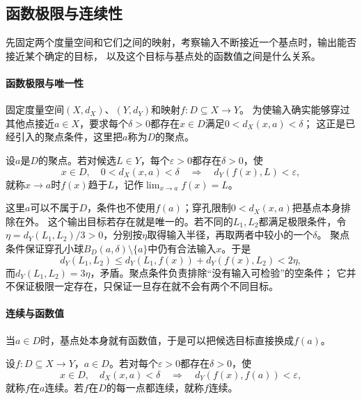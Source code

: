 \subsection{函数极限与连续性}
\label{sec:metric-map-limits}

先固定两个度量空间和它们之间的映射，考察输入不断接近一个基点时，输出能否接近某个确定的目标，
以及这个目标与基点处的函数值之间是什么关系。

\paragraph{函数极限与唯一性}

固定度量空间$(X,d_X)$、$(Y,d_Y)$和映射$f:D\subseteq X\to Y$。
为使输入确实能够穿过其他点接近$a\in X$，要求每个$\delta>0$都存在$x\in D$满足$0<d_X(x,a)<\delta$；
这正是已经引入的聚点条件，这里把$a$称为$D$的聚点。

\begin{definition}[函数极限]
\label{def:metric-function-limit}
设$a$是$D$的聚点。若对候选$L\in Y$，每个$\varepsilon>0$都存在$\delta>0$，使
\[
  x\in D,\quad 0<d_X(x,a)<\delta
  \quad\Longrightarrow\quad d_Y(f(x),L)<\varepsilon,
\]
就称$x\to a$时$f(x)$趋于$L$，记作$\lim_{x\to a}f(x)=L$。
\end{definition}

这里$a$可以不属于$D$，条件也不使用$f(a)$；穿孔限制$0<d_X(x,a)$把基点本身排除在外。
这个输出目标若存在就是唯一的。若不同的$L_1,L_2$都满足极限条件，令
$\eta=d_Y(L_1,L_2)/3>0$，分别按$\eta$取得输入半径，再取两者中较小的一个$\delta$。
聚点条件保证穿孔小球$B_D(a,\delta)\setminus\{a\}$中仍有合法输入$x$。于是
\[
  d_Y(L_1,L_2)
  \leq d_Y(L_1,f(x))+d_Y(f(x),L_2)<2\eta,
\]
而$d_Y(L_1,L_2)=3\eta$，矛盾。聚点条件负责排除“没有输入可检验”的空条件；
它并不保证极限一定存在，只保证一旦存在就不会有两个不同目标。

\paragraph{连续与函数值}

当$a\in D$时，基点处本身就有函数值，于是可以把候选目标直接换成$f(a)$。

\begin{definition}[连续]
\label{def:metric-continuity-at-point}
设$f:D\subseteq X\to Y$，$a\in D$。若对每个$\varepsilon>0$都存在$\delta>0$，使
\[
  x\in D,\quad d_X(x,a)<\delta
  \quad\Longrightarrow\quad d_Y(f(x),f(a))<\varepsilon,
\]
就称$f$在$a$连续。若$f$在$D$的每一点都连续，就称$f$连续。
\end{definition}

